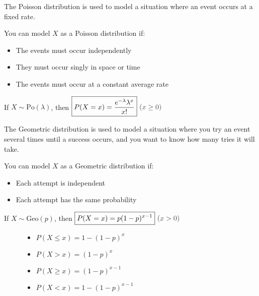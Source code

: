 \documentclass[../main.tex]{subfile}
\begin{document}


The Poisson distribution is used to model a situation where an event occurs at a fixed rate.

You can model $X$ as a Poisson distribution if:
\begin{itemize}
	\item The events must occur independently
	\item They must occur singly in space or time
	\item The events must occur at a constant average rate
\end{itemize}

\begin{center}
	If $X \sim \text{Po}(\lambda)$, then $\boxed{P(X = x) = \frac{e^{-\lambda} \lambda^x}{x!}}\ \constraint{x \geq 0}$
\end{center}


The Geometric distribution is used to model a situation where you try an event several times until a success occurs, and you want to know how many tries it will take.

You can model $X$ as a Geometric distribution if:
\begin{itemize}
	\item Each attempt is independent
	\item Each attempt has the same probability
\end{itemize}

\begin{center}
	If $X \sim \text{Geo}(p)$, then $\boxed{P(X = x) = p(1 - p)^{x - 1}}\ \constraint{x > 0}$

\end{center}

\begin{figure}[H]
\hspace{0.15\linewidth}
\begin{minipage}{0.3\linewidth}
\begin{itemize}
	\item $\boxed{P(X \leq x) = 1 - (1 - p)^x}$
	\item $P(X > x) = (1 - p)^x$
\end{itemize}
\end{minipage}\hfill
\begin{minipage}{0.3\linewidth}
\begin{itemize}
	\item $\boxed{P(X \geq x) = (1 - p)^{x - 1}}$
	\item $P(X < x) = 1 - (1 - p)^{x - 1}$
\end{itemize}
\end{minipage}
\hspace{0.15\linewidth}
\end{figure}
\end{document}
